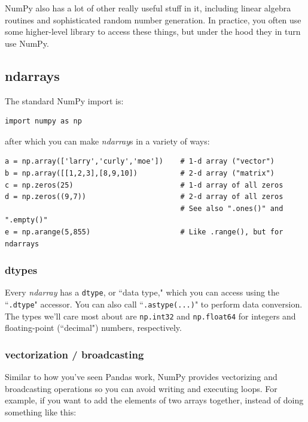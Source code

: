 \documentclass[12pt]{article}
\begin{document}
NumPy also has a lot of other really useful stuff in it, including linear
algebra routines and sophisticated random number generation. In practice, you
often use some higher-level library to access these things, but under the hood
they in turn use NumPy.

\subsection{ndarrays}

The standard NumPy import is:

\begin{Verbatim}[fontsize=small,samepage=true,frame=none]
import numpy as np
\end{Verbatim}

after which you can make \textit{ndarray}s in a variety of ways:

\begin{Verbatim}[fontsize=small,samepage=true,frame=none]
a = np.array(['larry','curly','moe'])    # 1-d array ("vector")
b = np.array([[1,2,3],[8,9,10])          # 2-d array ("matrix")
c = np.zeros(25)                         # 1-d array of all zeros
d = np.zeros((9,7))                      # 2-d array of all zeros
                                         # See also ".ones()" and ".empty()"
e = np.arange(5,855)                     # Like .range(), but for ndarrays

\end{Verbatim}

\subsubsection{dtypes}

Every \textit{ndarray} has a \texttt{dtype}, or ``data type," which you can
access using the ``\texttt{.dtype}" accessor. You can also call
``\texttt{.astype(...)}" to perform data conversion. The types we'll care most
about are \texttt{np.int32} and \texttt{np.float64} for integers and
floating-point (``decimal") numbers, respectively.

\subsubsection{vectorization / broadcasting}

Similar to how you've seen Pandas work, NumPy provides vectorizing and
broadcasting operations so you can avoid writing and executing loops. For
example, if you want to add the elements of two arrays together, instead of
doing something like this:
\end{document}
